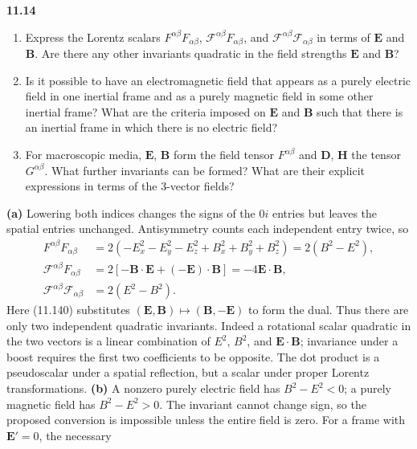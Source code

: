 \par\bigskip
\noindent\textbf{11.14}\quad\begin{enumerate}
\item[(a)] Express the Lorentz scalars $F^{\alpha\beta}F_{\alpha\beta}$, $\mathcal{F}^{\alpha\beta}F_{\alpha\beta}$, and $\mathcal{F}^{\alpha\beta}\mathcal{F}_{\alpha\beta}$ in terms of $\mathbf{E}$ and $\mathbf{B}$. Are there any other invariants quadratic in the field strengths $\mathbf{E}$ and $\mathbf{B}$?
\item[(b)] Is it possible to have an electromagnetic field that appears as a purely electric field in one inertial frame and as a purely magnetic field in some other inertial frame? What are the criteria imposed on $\mathbf{E}$ and $\mathbf{B}$ such that there is an inertial frame in which there is no electric field?
\item[(c)] For macroscopic media, $\mathbf{E}$, $\mathbf{B}$ form the field tensor $F^{\alpha\beta}$ and $\mathbf{D}$, $\mathbf{H}$ the tensor $G^{\alpha\beta}$. What further invariants can be formed? What are their explicit expressions in terms of the 3-vector fields?
\end{enumerate}
\solution
\textbf{(a)} Lowering both indices changes the signs of the
$0i$ entries but leaves the spatial entries unchanged. Antisymmetry
counts each independent entry twice, so
\begin{align*}
F^{\alpha\beta}F_{\alpha\beta}
 &=2(-E_x^2-E_y^2-E_z^2+B_x^2+B_y^2+B_z^2)
 =\boxed{2(B^2-E^2)},\\
\mathcal F^{\alpha\beta}F_{\alpha\beta}
 &=2[-\mathbf B\cdot\mathbf E+(-\mathbf E)\cdot\mathbf B]
 =\boxed{-4\mathbf E\cdot\mathbf B},\\
\mathcal F^{\alpha\beta}\mathcal F_{\alpha\beta}
 &=\boxed{2(E^2-B^2)}.
\end{align*}
Here (11.140) substitutes $(\mathbf E,\mathbf B)\mapsto
(\mathbf B,-\mathbf E)$ to form the dual. Thus there are only two
independent quadratic invariants. Indeed a rotational scalar
quadratic in the two vectors is a linear combination of $E^2$,
$B^2$, and $\mathbf E\cdot\mathbf B$; invariance under a boost
requires the first two coefficients to be opposite. The dot product
is a pseudoscalar under a spatial reflection, but a scalar under
proper Lorentz transformations.
\textbf{(b)} A nonzero purely electric field has $B^2-E^2<0$;
a purely magnetic field has $B^2-E^2>0$. The invariant cannot
change sign, so the proposed conversion is impossible unless the
entire field is zero. For a frame with $\mathbf E'=0$, the necessary

